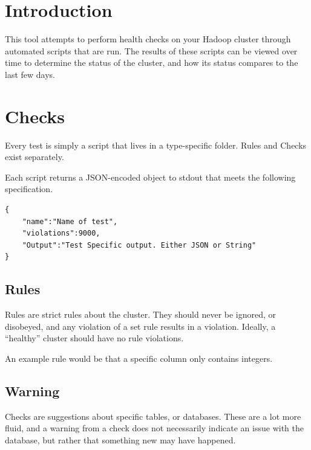 \begin{abstract}
This project attempts to act as a health report for your Hadoop cluster. At its core, this tool acts as a Hadoop
Testing Framework. Tests are either in the form of rules or checks, and either flag the table for review if a rule
fails, or throws a warning if a check fails. Tests can be scheduled, and the incremental output can be viewed through
the local frontend. This allows for the user to view the health and status of their database over time.
\end{abstract}

\section{Introduction}
This tool attempts to perform health checks on your Hadoop cluster through automated scripts that are run. The results
of these scripts can be viewed over time to determine the status of the cluster, and how its status compares to the
last few days.

\section{Checks}
Every test is simply a script that lives in a type-specific folder. Rules and Checks exist separately.

Each script returns a JSON-encoded object to {\ttfamily stdout} that meets the following specification.

\begin{verbatim}
{
    "name":"Name of test",
    "violations":9000,
    "Output":"Test Specific output. Either JSON or String"
}
\end{verbatim}


    \subsection{Rules}
    Rules are strict rules about the cluster. They should never be ignored, or disobeyed, and any violation of a set rule
    results in a violation. Ideally, a ``healthy'' cluster should have no rule violations.

    An example rule would be that a specific column only contains integers.

    \subsection{Warning}
    Checks are suggestions about specific tables, or databases. These are a lot more fluid, and a warning from a check does
    not necessarily indicate an issue with the database, but rather that something new may have happened.

